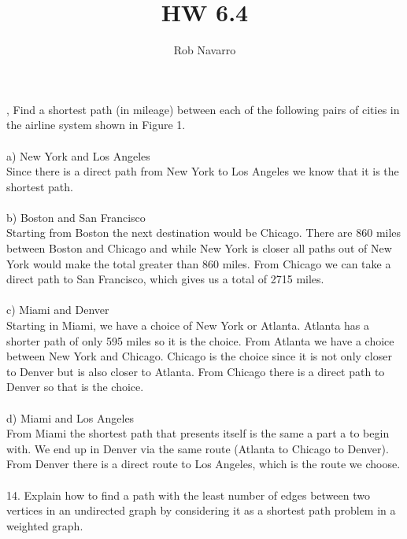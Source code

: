 \documentclass[11pt, oneside]{article}   	%
\title{HW 6.4}
\author{Rob Navarro}
\begin{document}
\maketitle

, Find a shortest path (in mileage) between each of the following pairs of cities in the airline system shown in Figure 1.\\\\
a) New York and Los Angeles\\
Since there is a direct path from New York to Los Angeles we know that it is the shortest path. \\\\
b) Boston and San Francisco\\
Starting from Boston the next destination would be Chicago. There are 860 miles between Boston and Chicago and while New York is closer all paths out of New York would make the total greater than 860 miles. From Chicago we can take a direct path to San Francisco, which gives us a total of 2715 miles. \\\\
c) Miami and Denver\\
Starting in Miami, we have a choice of New York or Atlanta. Atlanta has a shorter path of only 595 miles so it is the choice. From Atlanta we have a choice between New York and Chicago. Chicago is the choice since it is not only closer to Denver but is also closer to Atlanta. From Chicago there is a direct path to Denver so that is the choice. \\\\
d) Miami and Los Angeles\\
From Miami the shortest path that presents itself is the same a part a to begin with. We end up in Denver via the same route (Atlanta to Chicago to Denver). From Denver there is a direct route to Los Angeles, which is the route we choose.\\\\
14. Explain how to find a path with the least number of edges between two vertices in an undirected graph by considering it as a shortest path problem in a weighted graph.\\\\
\end{document}
